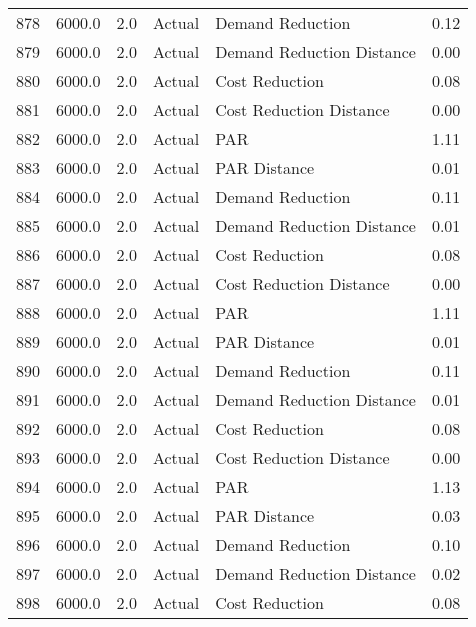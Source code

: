 \begin{longtable}{lrrllr}
878  &       6000.0 &     2.0 &         Actual &           Demand Reduction &   0.12 \\
879  &       6000.0 &     2.0 &         Actual &  Demand Reduction Distance &   0.00 \\
880  &       6000.0 &     2.0 &         Actual &             Cost Reduction &   0.08 \\
881  &       6000.0 &     2.0 &         Actual &    Cost Reduction Distance &   0.00 \\
882  &       6000.0 &     2.0 &         Actual &                        PAR &   1.11 \\
883  &       6000.0 &     2.0 &         Actual &               PAR Distance &   0.01 \\
884  &       6000.0 &     2.0 &         Actual &           Demand Reduction &   0.11 \\
885  &       6000.0 &     2.0 &         Actual &  Demand Reduction Distance &   0.01 \\
886  &       6000.0 &     2.0 &         Actual &             Cost Reduction &   0.08 \\
887  &       6000.0 &     2.0 &         Actual &    Cost Reduction Distance &   0.00 \\
888  &       6000.0 &     2.0 &         Actual &                        PAR &   1.11 \\
889  &       6000.0 &     2.0 &         Actual &               PAR Distance &   0.01 \\
890  &       6000.0 &     2.0 &         Actual &           Demand Reduction &   0.11 \\
891  &       6000.0 &     2.0 &         Actual &  Demand Reduction Distance &   0.01 \\
892  &       6000.0 &     2.0 &         Actual &             Cost Reduction &   0.08 \\
893  &       6000.0 &     2.0 &         Actual &    Cost Reduction Distance &   0.00 \\
894  &       6000.0 &     2.0 &         Actual &                        PAR &   1.13 \\
895  &       6000.0 &     2.0 &         Actual &               PAR Distance &   0.03 \\
896  &       6000.0 &     2.0 &         Actual &           Demand Reduction &   0.10 \\
897  &       6000.0 &     2.0 &         Actual &  Demand Reduction Distance &   0.02 \\
898  &       6000.0 &     2.0 &         Actual &             Cost Reduction &   0.08 \\

\end{longtable}
